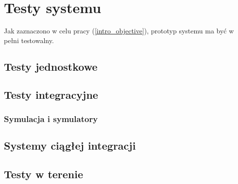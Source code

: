 \chapter{Testy systemu}

Jak zaznaczono w celu pracy (\ref{intro_objective}), prototyp systemu
ma być w pełni testowalny. 

\section{Testy jednostkowe}
\section{Testy integracyjne}
\subsection{Symulacja i symulatory}
\section{Systemy ciągłej integracji}
\section{Testy w terenie}

